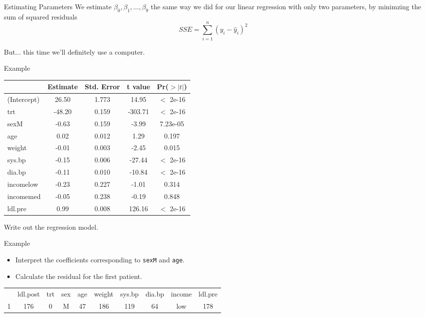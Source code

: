 \begin{frame}{Estimating Parameters}
    We estimate $\beta_0, \beta_1, \dots, \beta_9$ the same way we did for our linear regression with only two parameters, by minimzing the sum of squared residuals
    \[
        SSE = \sum_{i=1}^n (y_i - \hat{y}_i)^2
    \]
    
    \vspace{18pt}But... this time we'll definitely use a computer.
\end{frame}

\begin{frame}{Example}
    \begin{table}[h]
        \centering
        \begin{tabular}{lcccc}
            \hline
                        & Estimate & Std. Error & t value & Pr($>|t|$) \\
            \hline
            (Intercept) & 26.50  & 1.773 &  14.95 & $<$ 2e-16 \\
            trt     &    -48.20  & 0.159 &-303.71 & $<$ 2e-16 \\
            sexM    &     -0.63  & 0.159 &  -3.99 & 7.23e-05 \\
            age     &      0.02  & 0.012  &  1.29 &  0.197     \\
            weight  &     -0.01  & 0.003 &  -2.45 &  0.015   \\
            sys.bp  &     -0.15  & 0.006 & -27.44 & $<$ 2e-16 \\
            dia.bp  &     -0.11  & 0.010 & -10.84 & $<$ 2e-16 \\
            incomelow  &  -0.23  & 0.227 &  -1.01 &  0.314     \\
            incomemed  &  -0.05 &  0.238 &  -0.19  & 0.848     \\
            ldl.pre    &   0.99  & 0.008 & 126.16 & $<$ 2e-16 \\
            \hline
        \end{tabular}
    \end{table}
    Write out the regression model. 
\end{frame}

\begin{frame}{Example}
    \begin{itemize}
        \item Interpret the coefficients corresponding to \texttt{sexM} and \texttt{age}. 
        \item Calculate the residual for the first patient. 
    \end{itemize}
    \begin{table}[h]
        \centering\small
        \begin{tabular}{lccccccccc}
            \hline
             & ldl.post & trt & sex & age & weight & sys.bp & dia.bp & income & ldl.pre \\
            1 & 176   & 0 &  M & 47  &  186  &  119  &   64   & low & 178 \\
            \hline
        \end{tabular}
    \end{table}
\end{frame}

